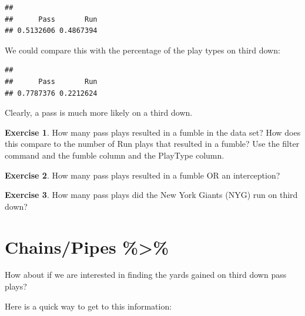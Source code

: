 \documentclass[
]{book}
\newenvironment{Shaded}{\begin{snugshade}}{\end{snugshade}}
\newcommand{\DecValTok}[1]{\textcolor[rgb]{0.00,0.00,0.81}{#1}}
\newcommand{\FunctionTok}[1]{\textcolor[rgb]{0.00,0.00,0.00}{#1}}
\newcommand{\NormalTok}[1]{#1}
\newcommand{\OtherTok}[1]{\textcolor[rgb]{0.56,0.35,0.01}{#1}}
\newcommand{\SpecialCharTok}[1]{\textcolor[rgb]{0.00,0.00,0.00}{#1}}
\theoremstyle{definition}
\theoremstyle{definition}
\theoremstyle{definition}
\newtheorem{exercise}{Exercise}[chapter]
\theoremstyle{definition}
\theoremstyle{remark}
\begin{document}
\begin{verbatim}
## 
##      Pass       Run 
## 0.5132606 0.4867394
\end{verbatim}

We could compare this with the percentage of the play types on third down:

\begin{Shaded}
\end{Shaded}

\begin{verbatim}
## 
##      Pass       Run 
## 0.7787376 0.2212624
\end{verbatim}

Clearly, a pass is much more likely on a third down.

\begin{exercise}
\protect\hypertarget{exr:unnamed-chunk-155}{}\label{exr:unnamed-chunk-155}How many pass plays resulted in a fumble in the data set? How does this compare to the number of Run plays that resulted in a fumble? Use the filter command and the fumble column and the PlayType column.
\end{exercise}

\begin{exercise}
\protect\hypertarget{exr:unnamed-chunk-156}{}\label{exr:unnamed-chunk-156}How many pass plays resulted in a fumble OR an interception?
\end{exercise}

\begin{exercise}
\protect\hypertarget{exr:unnamed-chunk-157}{}\label{exr:unnamed-chunk-157}How many pass plays did the New York Giants (NYG) run on third down?
\end{exercise}

\hypertarget{chainspipes}{%
\section{Chains/Pipes \%\textgreater\%}\label{chainspipes}}

How about if we are interested in finding the yards gained on third down pass plays?

Here is a quick way to get to this information:
\end{document}
